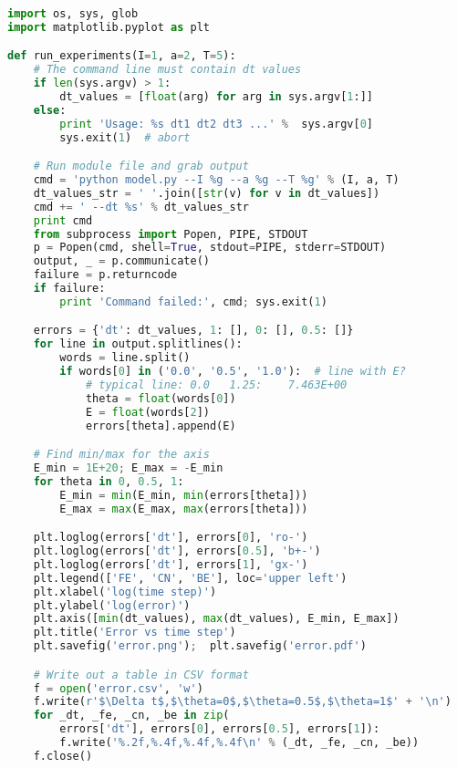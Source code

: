 \documentclass[graybox,sectrefs,envcountresetchap,open=right,final]{svmonodo}
\begin{document}
\begin{lstlisting}[language=Python,style=blue1bar_bluegreen]
import os, sys, glob
import matplotlib.pyplot as plt

def run_experiments(I=1, a=2, T=5):
    # The command line must contain dt values
    if len(sys.argv) > 1:
        dt_values = [float(arg) for arg in sys.argv[1:]]
    else:
        print 'Usage: %s dt1 dt2 dt3 ...' %  sys.argv[0]
        sys.exit(1)  # abort

    # Run module file and grab output
    cmd = 'python model.py --I %g --a %g --T %g' % (I, a, T)
    dt_values_str = ' '.join([str(v) for v in dt_values])
    cmd += ' --dt %s' % dt_values_str
    print cmd
    from subprocess import Popen, PIPE, STDOUT
    p = Popen(cmd, shell=True, stdout=PIPE, stderr=STDOUT)
    output, _ = p.communicate()
    failure = p.returncode
    if failure:
        print 'Command failed:', cmd; sys.exit(1)

    errors = {'dt': dt_values, 1: [], 0: [], 0.5: []}
    for line in output.splitlines():
        words = line.split()
        if words[0] in ('0.0', '0.5', '1.0'):  # line with E?
            # typical line: 0.0   1.25:    7.463E+00
            theta = float(words[0])
            E = float(words[2])
            errors[theta].append(E)

    # Find min/max for the axis
    E_min = 1E+20; E_max = -E_min
    for theta in 0, 0.5, 1:
        E_min = min(E_min, min(errors[theta]))
        E_max = max(E_max, max(errors[theta]))

    plt.loglog(errors['dt'], errors[0], 'ro-')
    plt.loglog(errors['dt'], errors[0.5], 'b+-')
    plt.loglog(errors['dt'], errors[1], 'gx-')
    plt.legend(['FE', 'CN', 'BE'], loc='upper left')
    plt.xlabel('log(time step)')
    plt.ylabel('log(error)')
    plt.axis([min(dt_values), max(dt_values), E_min, E_max])
    plt.title('Error vs time step')
    plt.savefig('error.png');  plt.savefig('error.pdf')

    # Write out a table in CSV format
    f = open('error.csv', 'w')
    f.write(r'$\Delta t$,$\theta=0$,$\theta=0.5$,$\theta=1$' + '\n')
    for _dt, _fe, _cn, _be in zip(
        errors['dt'], errors[0], errors[0.5], errors[1]):
        f.write('%.2f,%.4f,%.4f,%.4f\n' % (_dt, _fe, _cn, _be))
    f.close()


\end{lstlisting}
\end{document}
